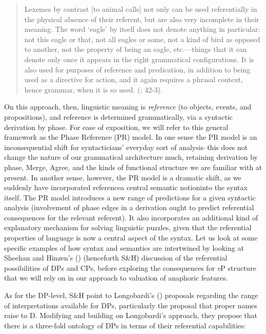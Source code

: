 \documentclass[output=paper
,modfonts
,nonflat
]{langsci/langscibook}
\begin{document}
\begin{quote}

Lexemes by contrast [to animal calls] not only can be used referentially in the physical absence of their referent, but are also very incomplete in their meaning. The word ‘eagle’ by itself does not denote anything in particular: not this eagle or that, not all eagles or some, not a kind of bird as opposed to another, not the property of being an eagle, etc.—things that it can denote only once it appears in the right grammatical configurations. It is also used for purposes of reference and predication, in addition to being used as a directive for action, and it again requires a phrasal context, hence grammar, when it is so used. (\citealt{HinzenSheehan:2013}: 42-3). 

\end{quote}

\noindent On this approach, then, linguistic meaning is \textit{reference} (to objects, events, and propositions), and reference is determined grammatically, via a syntactic derivation by phase. For ease of exposition, we will refer to this general framework as the Phase Reference (PR) model. In one sense the PR model is an inconsequential shift for syntacticians’ everyday sort of analysis–this does not change the nature of our grammatical architecture much, retaining derivation by phase, Merge, Agree, and the kinds of functional structure we are familiar with at present. In another sense, however, the PR model is a dramatic shift, as we suddenly have incorporated reference\textemdash a central semantic notion\textemdash into the syntax itself. The PR model introduces a new range of predictions for a given syntactic analysis (involvement of phase edges in a derivation ought to predict referential consequences for the relevant referent). It also incorporates an additional kind of explanatory mechanism for solving linguistic puzzles, given that the referential properties of language is now a central aspect of the syntax. Let us look at some specific examples of how syntax and semantics are intertwined by looking at Sheehan and Hinzen’s (\citeyear{SheehanHinzen:2011}) (henceforth S\&H) discussion of the referential possibilities of DPs and CPs, before exploring the consequences for \textit{v}P structure that we will rely on in our approach to valuation of anaphoric features.  

As for the DP-level, S\&H point to Longobardi’s (\citeyear{Longobardi:1994,Longobardi:2005}) proposals regarding the range of interpretations available for DPs, particularly the proposal that proper names raise to D. Modifying and building on Longobardi’s approach, they propose that there is a three-fold ontology of DPs in terms of their referential capabilities: 
\end{document}
